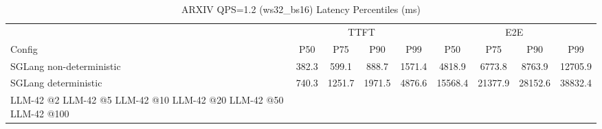 \begin{table}[htbp]
\centering
\caption{ARXIV QPS=1.2 (ws32_bs16) Latency Percentiles (ms)}
\label{tab:arxiv_qps1.2_ws32_bs16}
\begin{tabular}{l|cccc|cccc}
\toprule
& \multicolumn{4}{c|}{TTFT} & \multicolumn{4}{c}{E2E} \\
Config & P50 & P75 & P90 & P99 & P50 & P75 & P90 & P99 \\
\midrule
SGLang non-deterministic & 382.3 & 599.1 & 888.7 & 1571.4 & 4818.9 & 6773.8 & 8763.9 & 12705.9 \\
SGLang deterministic & 740.3 & 1251.7 & 1971.5 & 4876.6 & 15568.4 & 21377.9 & 28152.6 & 38832.4 \\
LLM-42 @2%
LLM-42 @5%
LLM-42 @10%
LLM-42 @20%
LLM-42 @50%
LLM-42 @100%
\bottomrule
\end{tabular}
\end{table}
